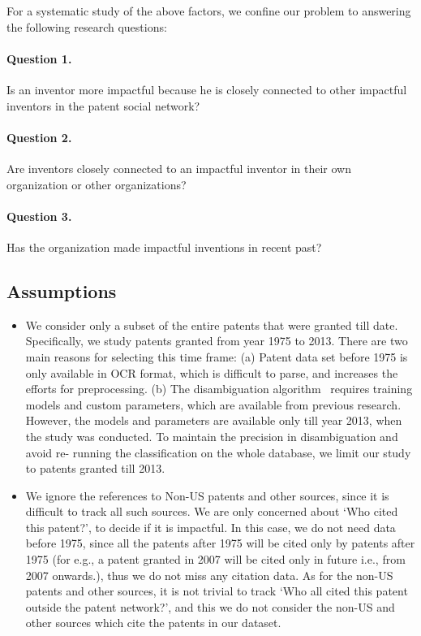 For a systematic study of the above factors, we confine our problem to
answering the following research questions:

\paragraph{Question 1.} Is an inventor more impactful because he is closely
connected to other impactful inventors in the patent social network? 

\paragraph{Question  2.} Are inventors closely connected to an impactful
inventor in their own organization or other organizations? %

\paragraph{Question  3.} Has the organization made impactful inventions in
recent past? %


\subsection{Assumptions}
\label{sec:assumptions}


	\begin{itemize}
	\squish
		
		\item We consider only a subset of the entire patents that were granted till
		date. Specifically, we study patents granted from year 1975 to 2013. There are
		two main reasons for selecting this time frame: (a) Patent data set before
		1975 is only available in OCR format, which is difficult to parse, and
		increases the efforts for preprocessing. (b) The disambiguation algorithm~\cite{disambiguation} 
		requires training models and custom parameters, which are available from previous research. However,
		the models and parameters are available only till year 2013, when the study
		was conducted. To maintain the precision in disambiguation and avoid re-
		running the classification on the whole database, we limit our study to
		patents granted till 2013.

		\item We ignore the references to Non-US patents and other sources, since it
		is difficult to track all such sources. 
		We are only concerned about `Who
		cited this patent?', to decide if it is impactful. In this case, we do not
		need data before 1975, since all the patents after 1975 will be cited only by
		patents after 1975 (for e.g., a patent granted in 2007 will be cited only in
		future i.e., from 2007 onwards.), thus we do not miss any citation data. As
		for the non-US patents and other sources, it is not trivial to track `Who all
		cited this patent outside the patent network?', and this we do not consider
		the non-US and other sources which cite the patents in our dataset.

	\end{itemize}


